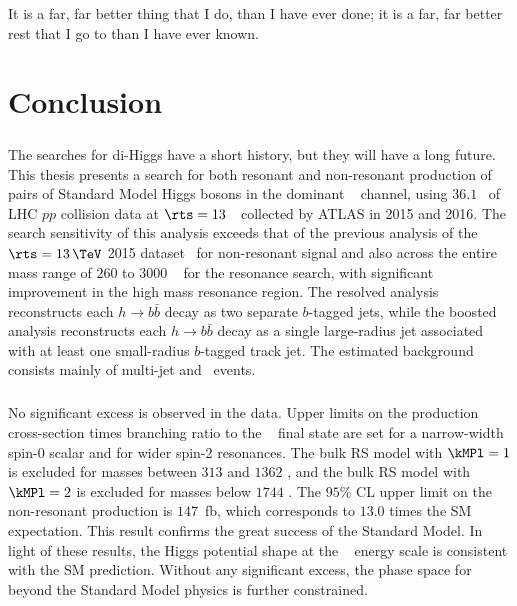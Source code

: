 \begin{savequote}[75mm]
It is a far, far better thing that I do, than I have ever done; it is a far, far better rest that I go to than I have ever known.
\end{savequote}

\chapter{Conclusion}
\label{conclusion}


\paragraph{}
The searches for di-Higgs have a short history, but they will have a long future. 
This thesis presents a search for both resonant and non-resonant production of pairs of Standard Model Higgs bosons in the dominant \bbbb~ channel, using $36.1$ \ifb\ of LHC $pp$ collision data at $\rts = 13$~\TeV\ collected by ATLAS in 2015 and 2016. 
The search sensitivity of this analysis exceeds that of the previous analysis of the $\rts = 13\,\TeV$ 2015 dataset~\cite{EXOT-2015-11} for non-resonant signal and also across the entire mass range of $260$ to $3000$ \GeV~ for the resonance search, with significant improvement in the high mass resonance region. 
The resolved analysis reconstructs each $h \to b\bar{b}$ decay as two separate $b$-tagged jets, while the boosted analysis reconstructs each $h \to b\bar{b}$ decay as a single large-radius jet associated with at least one small-radius $b$-tagged track jet.
The estimated background consists mainly of multi-jet and \ttbar\ events.

\paragraph{}
No significant excess is observed in the data. 
Upper limits on the production cross-section times branching ratio to the \bbbb~ final state are set for a narrow-width spin-0 scalar and for wider spin-2 resonances. 
The bulk RS model with $\kMPl = 1$ is excluded for masses between $313$ and $1362$ \GeV, and the bulk RS model with $\kMPl = 2$ is excluded for masses below $1744$ \GeV.
The $95\%$ CL upper limit on the non-resonant production is $147$~fb, which corresponds to $13.0$ times the SM expectation.
This result confirms the great success of the Standard Model.
In light of these results, the Higgs potential shape at the \TeV~ energy scale is consistent with the SM prediction.
Without any significant excess, the phase space for beyond the Standard Model physics is further constrained.

